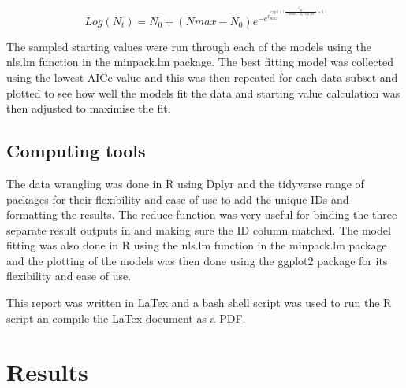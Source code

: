 \documentclass[11pt]{article}
\begin{document}

\[
     Log(N_t) = {N_0}+({Nmax}-{N_0})e^{-e^{r_{max}^{exp(1)\frac{t_{lag^{-t}}}{(Nmax - N_0)log(10)}+1}}}
\]

The sampled starting values were run through each of the models using the nls.lm function in the minpack.lm package. The best fitting model was collected using the lowest AICc value and this was then repeated for each data subset and plotted to see how well the models fit the data and starting value calculation was then adjusted to maximise the fit. 
\subsection{Computing tools}

The data wrangling was done in R using Dplyr and the tidyverse range of packages for their flexibility and ease of use to add the unique IDs and formatting the results. The reduce function was very useful for binding the three separate result outputs in and making sure the ID column matched. The model fitting was also done in R using the nls.lm function in the minpack.lm package and the plotting of the models was then done using the ggplot2 package for its flexibility and ease of use.

This report was written in LaTex and a bash shell script was used to run the R script an compile the LaTex document as a PDF.

\section{Results}
\end{document}
